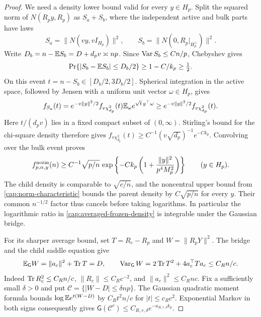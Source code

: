 \begin{proof}
We need a density lower bound valid for every $y\in H_p$. Split the
squared norm of $N(R_py,R_p)$ as $S_a+S_b$, where the independent
active and bulk parts have laws
\[
 S_a=\|N(vy,vI_{H_p})\|^2,\qquad
 S_b=\|N(0,R_p|_{H_p^\perp})\|^2.
\]
Write $D_b=n-\mathbb E S_b=D+d_pv\asymp np$. Since
$\operatorname{Var} S_b\le Cn/p$, Chebyshev gives
\[
 \Pr\{|S_b-\mathbb E S_b|\le D_b/2\}\ge1-C/k_p\ge\tfrac12.
\]
On this event $t=n-S_b\in[D_b/2,3D_b/2]$. Spherical integration
in the active space, followed by Jensen with a uniform unit vector
$\omega\in H_p$, gives
\[
 f_{S_a}(t)
 =e^{-v\|y\|^2/2}f_{v\chi_{d_p}^2}(t)
       \mathbb E_\omega e^{\sqrt t\,y^\top\omega}
 \ge e^{-v\|y\|^2/2}f_{v\chi_{d_p}^2}(t).
\]
Here $t/(d_pv)$ lies in a fixed compact subset of $(0,\infty)$.
Stirling's bound for the chi-square density therefore gives
$f_{v\chi_{d_p}^2}(t)\ge C^{-1}(v\sqrt{d_p})^{-1}e^{-Ck_p}$.
Convolving over the bulk event proves
\begin{equation}\label{cap:global-frozen-density}
 f_{p,\alpha,y}^{\rm norm}(n)
 \ge C^{-1}\sqrt{p/n}\,
       \exp\left\{-Ck_p\left(1+
              \frac{\|y\|^2}{p^4M_p^2}\right)\right\}
 \qquad(y\in H_p).
\end{equation}
The child density is comparable to $\sqrt{c/n}$, and the noncentral
upper bound from \eqref{cap:norm-characteristic} bounds the parent
density by $C\sqrt{p/n}$ for every $y$. Their common $n^{-1/2}$ factor
thus cancels before taking logarithms. In particular the logarithmic
ratio in \eqref{cap:averaged-frozen-density} is integrable under the
Gaussian bridge.

For its sharper average bound, set $T=R_c-R_p$ and
$W=\|R_pY\|^2$. The bridge and the child saddle equation give
\[
 \mathbb E_{\mathsf G}W=\|a_c\|^2+\operatorname{Tr} T=D,\qquad
 \operatorname{Var}_{\mathsf G}W=2\operatorname{Tr} T^2+4a_c^\top Ta_c\le C_Rn/c.
\]
Indeed $\operatorname{Tr} R_c^2\le C_Rn/c$, $\|R_c\|\le C_Rc^{-2}$, and
$\|a_c\|^2\le C_Rnc$. Fix a sufficiently small $\delta>0$ and put
$\mathcal C=\{|W-D|\le\delta np\}$. The Gaussian quadratic moment
formula bounds $\log\mathbb E e^{t(W-D)}$ by $C_Rt^2n/c$ for
$|t|\le c_Rc^2$. Exponential Markov in both signs consequently gives
$\mathsf G(\mathcal C^c)\le C_{R,r,\delta}e^{-a_{R,r,\delta}k_p}$.


\end{proof}

